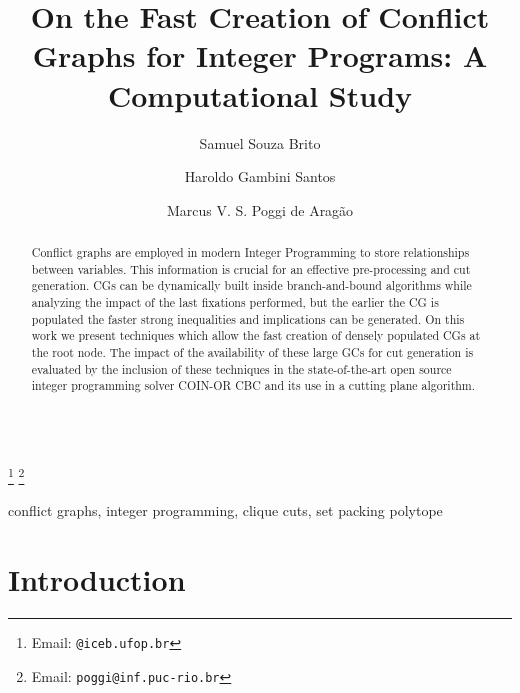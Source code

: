 \documentclass{endm}
\begin{document}
  

\begin{verbatim}\end{verbatim}\vspace{2.5cm}

\begin{frontmatter}

\title{On the Fast Creation of Conflict Graphs for Integer Programs: A Computational Study}

\author{Samuel Souza Brito \and Haroldo Gambini Santos}
 
\address{Departamento de Computação\\ Universidade Federal de Ouro Preto - UFOP\\ Ouro Preto, Brazil}
\author{Marcus V. S. Poggi de Aragão}
\address{Departamento de Informática\\ Pontifícia Universidade Católica do Rio de Janeiro - PUC-RIO\\ Rio de Janeiro, Brazil}
\thanks[mailSamuelHaroldo]{Email: {\texttt{@iceb.ufop.br}}} 
\thanks[mailPoggi]{Email: {\texttt{\normalshape poggi@inf.puc-rio.br}}}  

\begin{abstract}
Conflict graphs are employed in modern Integer Programming to store relationships between variables. This information is crucial for an effective pre-processing and cut generation. CGs can be dynamically built inside branch-and-bound algorithms while analyzing the impact of the last fixations performed, but the earlier the CG is populated the faster strong inequalities and implications can be generated. On this work we present techniques which allow the fast creation of densely populated CGs at the root node. The impact of the availability of these large GCs for cut generation is evaluated by the inclusion of these techniques in the state-of-the-art open source integer programming solver COIN-OR CBC and its use in a cutting plane algorithm.
\end{abstract}

\begin{keyword}
conflict graphs, integer programming, clique cuts, set packing polytope
\end{keyword}

\end{frontmatter}


\section{Introduction}\label{intro}
\end{document}
